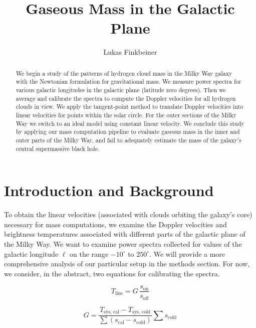 \documentclass[12pt]{article}
\title{Gaseous Mass in the Galactic Plane}
\author{Lukas Finkbeiner}
\begin{document}
\maketitle

\begin{abstract}


We begin a study of the patterns of hydrogen cloud mass in the Milky Way galaxy with the Newtonian formulation for gravitational mass. We measure power spectra for various galactic longitudes in the galactic plane (latitude zero degrees). Then we average and calibrate the spectra to compute the Doppler velocities for all hydrogen clouds in view. We apply the tangent-point method to translate Doppler velocities into linear velocities for points within the solar circle. For the outer sections of the Milky Way we switch to an ideal model using constant linear velocity. We conclude this study by applying our mass computation pipeline to evaluate gaseous mass in the inner and outer parts of the Milky Way, and fail to adequately estimate the mass of the galaxy's central supermassive black hole.

\end{abstract}

\section{Introduction and Background}

\quad \quad To obtain the linear velocities (associated with clouds orbiting the galaxy's core) necessary for mass computations, we examine the Doppler velocities and brightness temperatures associated with different parts of the galactic plane of the Milky Way. We want to examine power spectra collected for values of the galactic longitude $\ell$ on the range $-10^\circ$ to $250^\circ$. We will provide a more comprehensive analysis of our particular setup in the methods section. For now, we consider, in the abstract, two equations for calibrating the spectra. 

\begin{equation} \label{eq:line_shape}
T_\text{line} = G \, \frac{s_\text{on}}{s_\text{off}}
\end{equation}

\begin{equation} \label{eq:line_gain}
G = \frac{T_\text{sys, cal} - T_\text{sys, cold}}{\sum{(s_\text{cal} - s_\text{cold})}} \sum{s_\text{cold}}
\end{equation}
\end{document}
